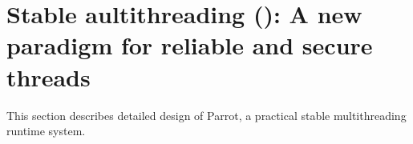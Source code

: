\section{Stable aultithreading (): A new paradigm for reliable and secure threads} \label{sec:topic1}

This section describes detailed design of Parrot, a practical stable 
multithreading runtime system.

